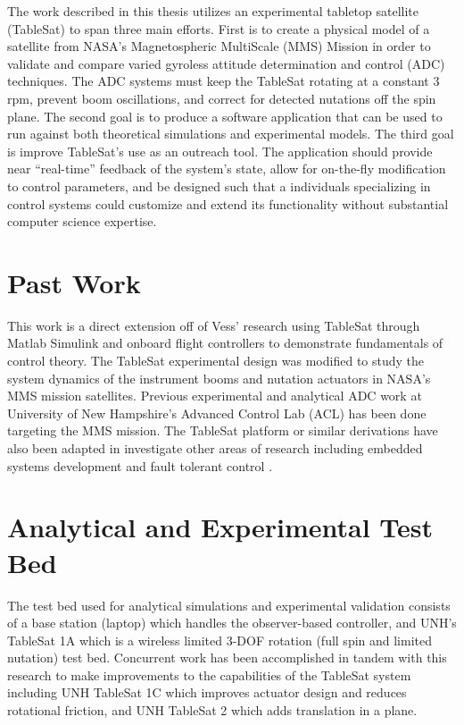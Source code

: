 The work described in this thesis utilizes an experimental tabletop satellite (TableSat) \cite{vessthesis} to span three main efforts.  First is to create a physical model of a satellite from NASA's Magnetospheric MultiScale (MMS) Mission in order to validate and compare varied gyroless attitude determination and control (ADC) techniques.  The ADC systems must keep the TableSat rotating at a constant 3 rpm, prevent boom oscillations, and correct for detected nutations off the spin plane.  The second goal is to produce a software application that can be used to run against both theoretical simulations and experimental models.  The third goal is improve TableSat's use as an outreach tool.  The application should provide near ``real-time'' feedback of the system's state, allow for on-the-fly modification to control parameters, and be designed such that a individuals specializing in control systems could customize and extend its functionality without substantial computer science expertise.

\section{Past Work}
\label{sec:PastWork}

This work is a direct extension off of Vess' \cite{vessthesis} research using TableSat through Matlab Simulink and onboard flight controllers to demonstrate fundamentals of control theory.  The TableSat experimental design was modified to study the system dynamics of the instrument booms and nutation actuators in NASA's MMS mission satellites.  Previous experimental \cite{tsat1b} \cite{tsat1c} \cite{tsat2} and analytical \cite{mushawehthesis} ADC work at University of New Hampshire's Advanced Control Lab (ACL) has been done targeting the MMS mission.  The TableSat platform or similar derivations have also been adapted in investigate other areas of research including embedded systems development \cite{tablesat_xuml} and fault tolerant control \cite{tablesat_object_bench} \cite{nanjing_university}.


\section{Analytical and Experimental Test Bed}
\label{sec:AnalyticalandExperimentalTestbed}

The test bed used for analytical simulations and experimental validation consists of a base station (laptop) which handles the observer-based controller, and UNH's TableSat 1A which is a wireless limited 3-DOF rotation (full spin and limited nutation) test bed.  Concurrent work has been accomplished in tandem with this research to make improvements to the capabilities of the TableSat system including UNH TableSat 1C \cite{tsat1c} which improves actuator design and reduces rotational friction, and UNH TableSat 2 \cite{tsat2} which adds translation in a plane.


